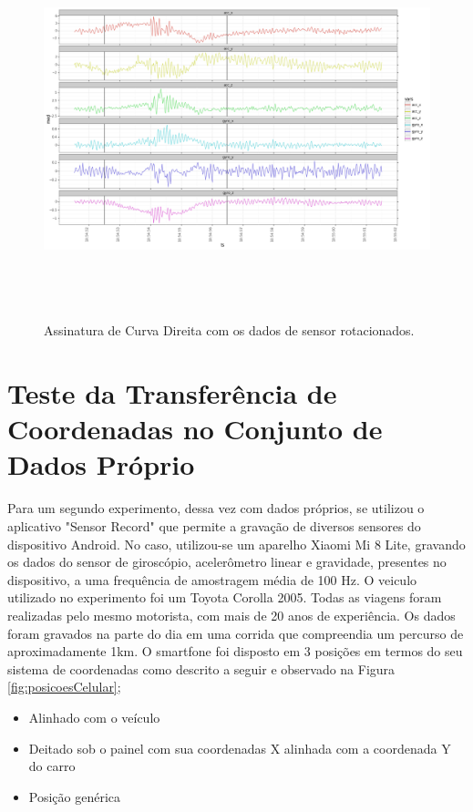 \begin{figure}[H]
    \centering
    \includegraphics[height=110mm]{Figuras/assinaturaCurvaDireita.png}
    \caption{Assinatura de Curva Direita com os dados de sensor rotacionados.}
    \label{fig:assinaturaCurvaDireita}
\end{figure}{}

\section{Teste da Transferência de Coordenadas no Conjunto de Dados Próprio}

Para um segundo experimento, dessa vez com dados próprios, se utilizou o aplicativo "Sensor Record" que permite a gravação de diversos sensores do dispositivo Android. No caso, utilizou-se um aparelho Xiaomi Mi 8 Lite, gravando os dados do sensor de giroscópio, acelerômetro linear e gravidade, presentes no dispositivo, a uma frequência de amostragem média de 100 Hz. O veiculo utilizado no experimento foi um Toyota Corolla 2005. Todas as viagens foram realizadas pelo mesmo motorista, com mais de 20 anos de experiência. Os dados foram gravados na parte do dia em uma corrida que compreendia um percurso de aproximadamente 1km. O smartfone foi disposto em 3 posições em termos do seu sistema de coordenadas como descrito a seguir e observado na Figura \ref{fig:posicoesCelular};

\begin{itemize}
    \item Alinhado com o veículo
    \item Deitado sob o painel com sua coordenadas X alinhada com a coordenada Y do carro
    \item Posição genérica
\end{itemize}{}

